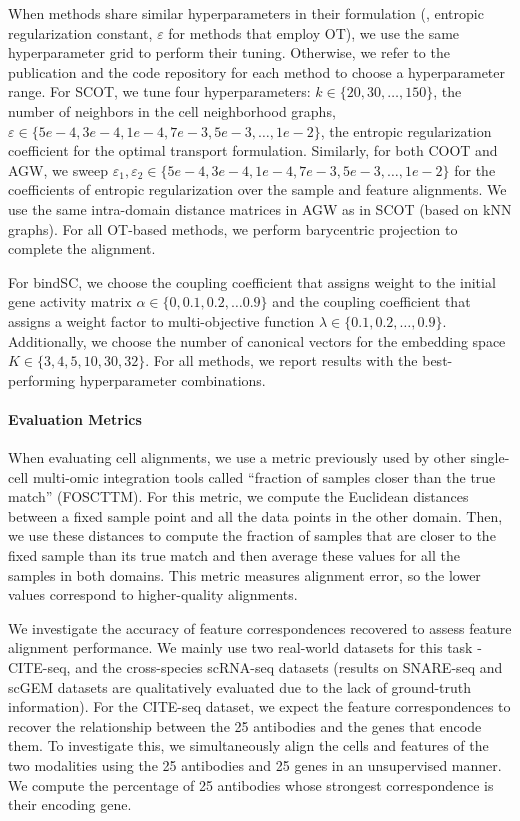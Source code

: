 When methods share similar hyperparameters in their formulation (\eg,
entropic regularization constant, $\varepsilon$ for methods that employ OT),
we use the same hyperparameter grid to perform their tuning. Otherwise,
we refer to the publication and the code repository for each method to choose a hyperparameter range.
For SCOT, we tune four hyperparameters: $k \in \{20, 30, \dots, 150\}$, the number of neighbors
in the cell neighborhood graphs, $\varepsilon \in \{5e-4, 3e-4, 1e-4, 7e-3, 5e-3, \dots, 1e-2 \}$,
the entropic regularization coefficient for the optimal transport formulation. Similarly,
for both COOT and AGW, we sweep
$\varepsilon_1, \varepsilon_2 \in \{5e-4, 3e-4, 1e-4, 7e-3, 5e-3, \dots, 1e-2 \}$
for the coefficients of entropic regularization over the sample and feature alignments.
We use the same intra-domain distance matrices in AGW as in SCOT (based on kNN graphs).
For all OT-based methods, we perform barycentric projection to complete the alignment.

For bindSC, we choose the coupling coefficient that assigns weight to the
initial gene activity matrix $\alpha \in \{0, 0.1, 0.2, \dots 0.9\}$ and
the coupling coefficient that assigns a weight factor to multi-objective function
$\lambda \in \{0.1, 0.2, \dots, 0.9\}$. Additionally, we choose the number of canonical vectors
for the embedding space $K \in \{3, 4, 5, 10, 30, 32\}$.  For all methods,
we report results with the best-performing hyperparameter combinations.

\paragraph{Evaluation Metrics} When evaluating cell alignments, we use a metric previously used
by other single-cell multi-omic integration tools
\citep{liu_et_al:LIPIcs:2019:11040,singh20,cao2020unsupervised,Demetci20,Pamona,Demetci22,bindSC}
called ``fraction of samples closer than the true match'' (FOSCTTM). For this metric,
we compute the Euclidean distances between a fixed sample point and all the data points
in the other domain. Then, we use these distances to compute the fraction of samples
that are closer to the fixed sample than its true match and then average these values
for all the samples in both domains. This metric measures alignment error, so the lower values
correspond to higher-quality alignments.

We investigate the accuracy of feature correspondences recovered to assess feature alignment
performance. We mainly use two real-world datasets for this task - CITE-seq,
and the cross-species scRNA-seq datasets (results on SNARE-seq and scGEM datasets
are qualitatively evaluated due to the lack of ground-truth information). For the CITE-seq dataset,
we expect the feature correspondences to recover the relationship between the 25 antibodies
and the genes that encode them. To investigate this, we simultaneously align the cells and
features of the two modalities using the 25 antibodies and 25 genes in an unsupervised manner.
We compute the percentage of 25 antibodies whose strongest correspondence is their encoding gene.

